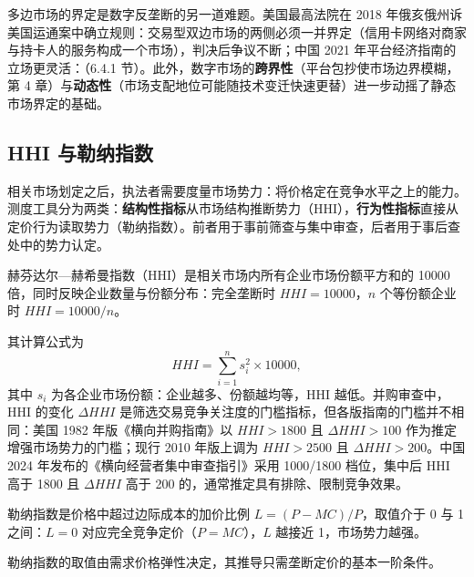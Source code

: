 多边市场的界定是数字反垄断的另一道难题。美国最高法院在 2018 年俄亥俄州诉美国运通案中确立规则：交易型双边市场的两侧必须一并界定（信用卡网络对商家与持卡人的服务构成一个市场），判决后争议不断；中国 2021 年平台经济指南的立场更灵活：（6.4.1 节）。此外，数字市场的\textbf{跨界性}（平台包抄使市场边界模糊，第 4 章）与\textbf{动态性}（市场支配地位可能随技术变迁快速更替）进一步动摇了静态市场界定的基础。

\subsection{HHI 与勒纳指数}

相关市场划定之后，执法者需要度量市场势力：将价格定在竞争水平之上的能力。测度工具分为两类：\textbf{结构性指标}从市场结构推断势力（HHI），\textbf{行为性指标}直接从定价行为读取势力（勒纳指数）。前者用于事前筛查与集中审查，后者用于事后查处中的势力认定。

\begin{definition}
赫芬达尔—赫希曼指数（HHI）是相关市场内所有企业市场份额平方和的 10000 倍，同时反映企业数量与份额分布：完全垄断时 $HHI = 10000$，$n$ 个等份额企业时 $HHI = 10000/n$。
\end{definition}

其计算公式为
\[
HHI = \sum_{i=1}^{n} s_i^2 \times 10000,
\]
其中 $s_i$ 为各企业市场份额：企业越多、份额越均等，HHI 越低。并购审查中，HHI 的变化 $\Delta HHI$ 是筛选交易竞争关注度的门槛指标，但各版指南的门槛并不相同：美国 1982 年版《横向并购指南》以 $HHI > 1800$ 且 $\Delta HHI > 100$ 作为推定增强市场势力的门槛；现行 2010 年版上调为 $HHI > 2500$ 且 $\Delta HHI > 200$。中国 2024 年发布的《横向经营者集中审查指引》采用 1000/1800 档位，集中后 HHI 高于 1800 且 $\Delta HHI$ 高于 200 的，通常推定具有排除、限制竞争效果。

\begin{definition}
勒纳指数是价格中超过边际成本的加价比例 $L = (P - MC)/P$，取值介于 0 与 1 之间：$L = 0$ 对应完全竞争定价（$P = MC$），$L$ 越接近 1，市场势力越强。
\end{definition}

勒纳指数的取值由需求价格弹性决定，其推导只需垄断定价的基本一阶条件。

